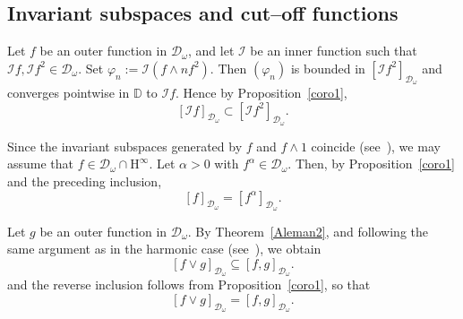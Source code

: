 \documentclass[12pt,reqno,a4paper]{amsart}
\newtheorem{lem}[prop]{Lemma}
\newcommand{\kH}{\mathrm{H^\infty  }}
\newcommand{\cD}{{\mathcal{D}}}
\numberwithin{equation}{section}
\begin{document}
	
	
	
	
	\subsection{Invariant subspaces and cut--off functions}
	
	Let $f$ be an outer function in $\mathcal{D}_\omega$, and let $\mathcal{I}$ be an inner function such that $\mathcal{I}f, \mathcal{I}f^2 \in \mathcal{D}_\omega$. Set $\varphi_n := \mathcal{I}(f \wedge n f^2)$. Then $(\varphi_n)$ is bounded in $[\mathcal{I}f^2]_{\mathcal{D}_\omega}$ and converges pointwise in $\mathbb{D}$ to $\mathcal{I}f$. Hence by Proposition~\ref{coro1},
	\[
	[\mathcal{I}f]_{\mathcal{D}_\omega} \subset [\mathcal{I}f^2]_{\mathcal{D}_\omega}.
	\]
	
	Since the invariant subspaces generated by $f$ and $f \wedge 1$ coincide (see~\cite{Al}), we may assume that $f \in \mathcal{D}_\omega \cap \kH$. Let $\alpha>0$ with $f^\alpha \in \mathcal{D}_\omega$. Then, by Proposition~\ref{coro1} and the preceding inclusion,
	\[
	[f]_{\mathcal{D}_\omega} = [f^\alpha]_{\mathcal{D}_\omega}.
	\]
	
	Let $g$ be an outer function in $\mathcal{D}_\omega$. By Theorem~\ref{Aleman2}, and following the same argument as in the harmonic case (see~\cite[Theorem~4.1]{RS2}), we obtain
	\[
	[f \vee g]_{\mathcal{D}_\omega} \subseteq [f,g]_{\mathcal{D}_\omega}.
	\]
	and the reverse inclusion follows from Proposition~\ref{coro1}, so that
	\[
	[f \vee g]_{\mathcal{D}_\omega} = [f,g]_{\mathcal{D}_\omega}.
	\]
	
\end{document}
